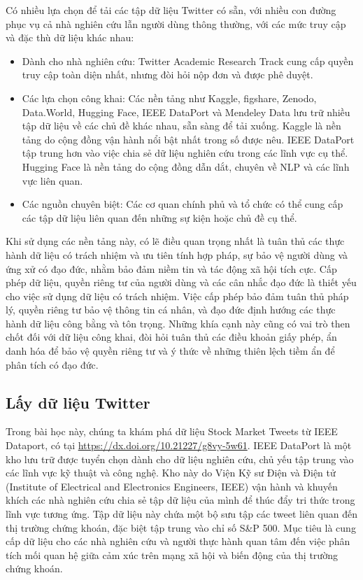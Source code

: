 Có nhiều lựa chọn để tải các tập dữ liệu Twitter có sẵn, với nhiều con đường phục vụ cả nhà nghiên cứu lẫn người dùng thông thường, với các mức truy cập và đặc thù dữ liệu khác nhau:

\begin{itemize}
  \item Dành cho nhà nghiên cứu: Twitter Academic Research Track cung cấp quyền truy cập toàn diện nhất, nhưng đòi hỏi nộp đơn và được phê duyệt.
  \item Các lựa chọn công khai: Các nền tảng như Kaggle, figshare, Zenodo, Data.World, Hugging Face, IEEE DataPort và Mendeley Data lưu trữ nhiều tập dữ liệu về các chủ đề khác nhau, sẵn sàng để tải xuống. Kaggle là nền tảng do cộng đồng vận hành nổi bật nhất trong số được nêu. IEEE DataPort tập trung hơn vào việc chia sẻ dữ liệu nghiên cứu trong các lĩnh vực cụ thể. Hugging Face là nền tảng do cộng đồng dẫn dắt, chuyên về NLP và các lĩnh vực liên quan.
  \item Các nguồn chuyên biệt: Các cơ quan chính phủ và tổ chức có thể cung cấp các tập dữ liệu liên quan đến những sự kiện hoặc chủ đề cụ thể.
\end{itemize}

Khi sử dụng các nền tảng này, có lẽ điều quan trọng nhất là tuân thủ các thực hành dữ liệu có trách nhiệm và ưu tiên tính hợp pháp, sự bảo vệ người dùng và ứng xử có đạo đức, nhằm bảo đảm niềm tin và tác động xã hội tích cực. Cấp phép dữ liệu, quyền riêng tư của người dùng và các cân nhắc đạo đức là thiết yếu cho việc sử dụng dữ liệu có trách nhiệm. Việc cấp phép bảo đảm tuân thủ pháp lý, quyền riêng tư bảo vệ thông tin cá nhân, và đạo đức định hướng các thực hành dữ liệu công bằng và tôn trọng. Những khía cạnh này cũng có vai trò then chốt đối với dữ liệu công khai, đòi hỏi tuân thủ các điều khoản giấy phép, ẩn danh hóa để bảo vệ quyền riêng tư và ý thức về những thiên lệch tiềm ẩn để phân tích có đạo đức.

\subsection{Lấy dữ liệu Twitter}

Trong bài học này, chúng ta khám phá dữ liệu Stock Market Tweets từ IEEE Dataport, có tại \url{https://dx.doi.org/10.21227/g8vy-5w61}. IEEE DataPort là một kho lưu trữ được tuyển chọn dành cho dữ liệu nghiên cứu, chủ yếu tập trung vào các lĩnh vực kỹ thuật và công nghệ. Kho này do Viện Kỹ sư Điện và Điện tử (Institute of Electrical and Electronics Engineers, IEEE) vận hành và khuyến khích các nhà nghiên cứu chia sẻ tập dữ liệu của mình để thúc đẩy tri thức trong lĩnh vực tương ứng. Tập dữ liệu này chứa một bộ sưu tập các tweet liên quan đến thị trường chứng khoán, đặc biệt tập trung vào chỉ số S\&P 500. Mục tiêu là cung cấp dữ liệu cho các nhà nghiên cứu và người thực hành quan tâm đến việc phân tích mối quan hệ giữa cảm xúc trên mạng xã hội và biến động của thị trường chứng khoán.


